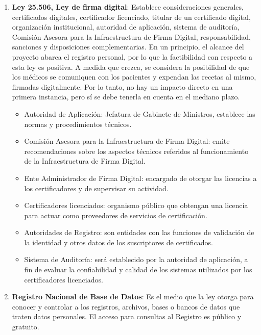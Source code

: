 \begin{enumerate}
        \item \textbf{Ley 25.506, Ley de firma digital}:
        Establece consideraciones generales, certificados digitales, certificador licenciado, titular de un certificado digital, organización institucional, autoridad de aplicación, sistema de auditoría, Comisión Asesora para la Infraestructura de Firma Digital, responsabilidad, sanciones y disposiciones complementarias.
        En un principio, el alcance del proyecto abarca el registro personal, por lo que la factibilidad con respecto a esta ley es positiva.
        A medida que crezca, se considera la posibilidad de que los médicos se comuniquen con los pacientes y expendan las recetas al mismo, firmadas digitalmente.
        Por lo tanto, no hay un impacto directo en una primera instancia, pero sí se debe tenerla en cuenta en el mediano plazo.
        \begin{itemize}
            \item Autoridad de Aplicación: Jefatura de Gabinete de Ministros, establece las normas y procedimientos técnicos.
            \item Comisión Asesora para la Infraestructura de Firma Digital: emite recomendaciones sobre los aspectos técnicos referidos al funcionamiento de la Infraestructura de Firma Digital.
            \item Ente Administrador de Firma Digital: encargado de otorgar las licencias a los certificadores y de supervisar su actividad.
            \item Certificadores licenciados: organismo público que obtengan una licencia para actuar como proveedores de servicios de certificación.
            \item Autoridades de Registro: son entidades con las funciones de validación de la identidad y otros datos de los suscriptores de certificados.
            \item Sistema de Auditoría: será establecido por la autoridad de aplicación, a fin de evaluar la confiabilidad y calidad de los sistemas utilizados por los certificadores licenciados.
        \end{itemize}
        
        \item \textbf{Registro Nacional de Base de Datos}:        
        Es el medio que la ley otorga para conocer y controlar a los registros, archivos, bases o bancos de datos que traten datos personales.
        El acceso para consultas al Registro es público y gratuito.
        

\end{enumerate}

